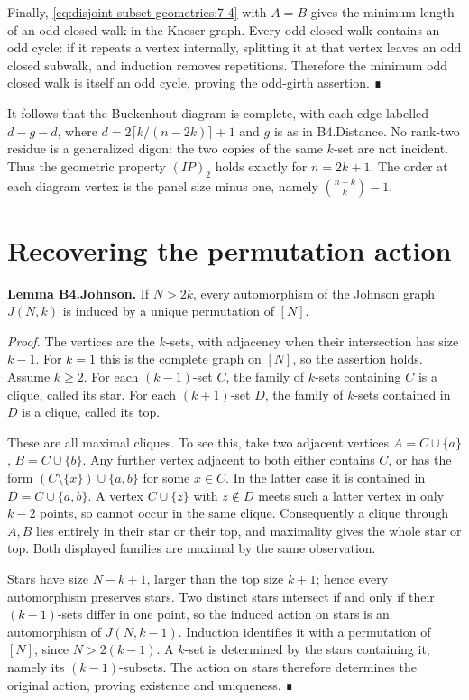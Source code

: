 Finally, \eqref{eq:disjoint-subset-geometries:7-4} with \(A=B\) gives the minimum length of an odd closed walk in the Kneser graph. Every odd closed walk contains an odd cycle: if it repeats a vertex internally, splitting it at that vertex leaves an odd closed subwalk, and induction removes repetitions. Therefore the minimum odd closed walk is itself an odd cycle, proving the odd-girth assertion. ∎

It follows that the Buekenhout diagram is complete, with each edge labelled \(d-g-d\), where \(d=2\lceil k/(n-2k)\rceil+1\) and \(g\) is as in B4.Distance. No rank-two residue is a generalized digon: the two copies of the same \(k\)-set are not incident. Thus the geometric property \((IP)_2\) holds exactly for \(n=2k+1\). The order at each diagram vertex is the panel size minus one, namely \(\binom{n-k}{k}-1\).
\section{Recovering the permutation action}
\textbf{Lemma B4.Johnson.} If \(N>2k\), every automorphism of the Johnson graph \(J(N,k)\) is induced by a unique permutation of \([N]\).

\emph{Proof.} The vertices are the \(k\)-sets, with adjacency when their intersection has size \(k-1\). For \(k=1\) this is the complete graph on \([N]\), so the assertion holds. Assume \(k\geq2\). For each \((k-1)\)-set \(C\), the family of \(k\)-sets containing \(C\) is a clique, called its star. For each \((k+1)\)-set \(D\), the family of \(k\)-sets contained in \(D\) is a clique, called its top.

These are all maximal cliques. To see this, take two adjacent vertices \(A=C\cup\{a\}\), \(B=C\cup\{b\}\). Any further vertex adjacent to both either contains \(C\), or has the form \((C\setminus\{x\})\cup\{a,b\}\) for some \(x\in C\). In the latter case it is contained in \(D=C\cup\{a,b\}\). A vertex \(C\cup\{z\}\) with \(z\notin D\) meets such a latter vertex in only \(k-2\) points, so cannot occur in the same clique. Consequently a clique through \(A,B\) lies entirely in their star or their top, and maximality gives the whole star or top. Both displayed families are maximal by the same observation.

Stars have size \(N-k+1\), larger than the top size \(k+1\); hence every automorphism preserves stars. Two distinct stars intersect if and only if their \((k-1)\)-sets differ in one point, so the induced action on stars is an automorphism of \(J(N,k-1)\). Induction identifies it with a permutation of \([N]\), since \(N>2(k-1)\). A \(k\)-set is determined by the stars containing it, namely its \((k-1)\)-subsets. The action on stars therefore determines the original action, proving existence and uniqueness. ∎

